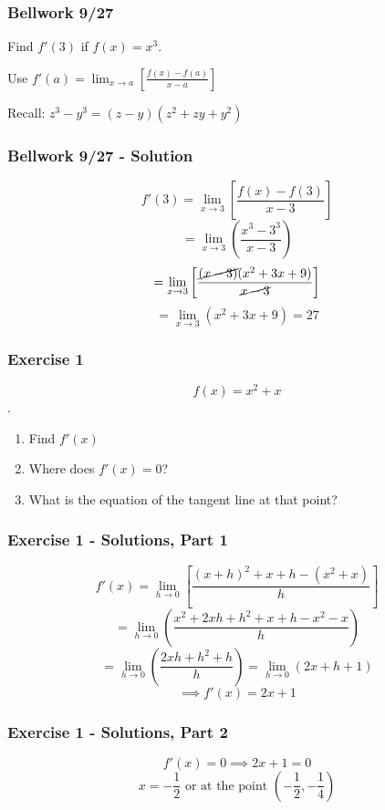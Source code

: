 \documentclass[12pt]{beamer}
\begin{document}
\begin{frame}
	\frametitle{Bellwork 9/27}
	\initclock

	\large
	\vfill
	\vfill
	Find $f'(3)$ if $f(x)=x^3$.\par
	\vfill
	Use $f'(a) = \displaystyle\lim_{x\to a}\left[\frac{f(x)-f(a)}{x-a}\right]$\par
	\vfill
	Recall: $z^3-y^3=(z-y)(z^2+zy+y^2)$\par
	\vfill
	\vfill
	\vfill

	\small
	\crono
\end{frame}
\begin{frame}
	\frametitle{Bellwork 9/27 - Solution}

	\large
	\[f'(3) = \displaystyle\lim_{x\to 3}\left[\frac{f(x)-f(3)}{x-3}\right]\]
	\[=\displaystyle\lim_{x\to 3}\left(\frac{x^3-3^3}{x-3}\right)\]
	\[=\displaystyle\lim_{x\to 3}\left[\frac{\cancel{(x-3)}(x^2+3x+9)}{\cancel{x-3}}\right]\]
	\[=\displaystyle\lim_{x\to 3}\left(x^2+3x+9\right)=\boxed{27}\]
\end{frame}
\begin{frame}
	\frametitle{Exercise 1}

	\large
	\vfill
	\vfill
	\[f(x)=x^2+x\].\par

	\begin{enumerate}\itemsep1ex
		\item Find $f'(x)$\par
		\item Where does $f'(x)=0$?\par
		\item What is the equation of the tangent line at that point?\par
	\end{enumerate}
	\vfill
	\vfill
	\vfill
\end{frame}
\begin{frame}
	\frametitle{Exercise 1 - Solutions, Part 1}

	\large
	\[f'(x) = \displaystyle\lim_{h\to 0}\left[\frac{(x+h)^2+x+h-(x^2+x)}{h}\right]\]
	\[=\displaystyle\lim_{h\to 0}\left(\frac{x^2+2xh+h^2+x+h-x^2-x}{h}\right)\]
	\[=\displaystyle\lim_{h\to 0}\left(\frac{2xh+h^2+h}{h}\right)=\displaystyle\lim_{h\to 0}\left(2x+h+1\right)\]
	\[\implies\boxed{f'(x)=2x+1}\]
\end{frame}
\begin{frame}
	\frametitle{Exercise 1 - Solutions, Part 2}

	\[f'(x)=0\implies 2x+1=0\]
	\[\boxed{x=-\frac{1}{2}}\text{ or }\boxed{\text{at the point }\left(-\frac{1}{2}, -\frac{1}{4}\right)}\]
\end{frame}
\end{document}
